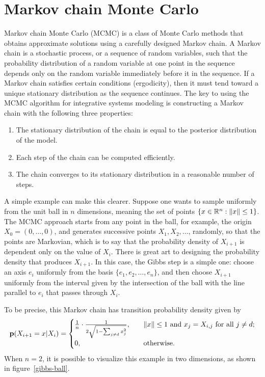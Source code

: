 \section{Markov chain Monte Carlo}
Markov chain Monte Carlo (MCMC) is a class of Monte Carlo methods that
obtains approximate solutions using a carefully designed Markov
chain. A Markov chain is a stochastic process, or a sequence of random
variables, such that the probability distribution of a random variable
at one point in the sequence depends only on the random variable
immediately before it in the sequence. If a Markov chain satisfies
certain conditions (ergodicity), then it must tend toward a unique stationary
distribution as the sequence continues. The key to using the MCMC
algorithm for integrative systems modeling is constructing a Markov
chain with the following three properties:
\begin{enumerate}
\item The stationary distribution of the chain is equal to the
  posterior distribution of the model.
\item Each step of the chain can be computed efficiently.
\item The chain converges to its stationary distribution in a
  reasonable number of steps.
\end{enumerate}

A simple example can make this clearer. Suppose one wants to sample
uniformly from the unit ball in $n$ dimensions, meaning the set of
points $\{x \in \mathbb{R}^n: \|x\| \leq 1\}$.  The MCMC approach starts
from any point in the ball, for example, the origin $X_0 = (0, \ldots,
0)$, and generates successive points $X_1, X_2, \ldots$, randomly, so
that the points are Markovian, which is to say that the probability density
of $X_{i+1}$ is dependent only on the value of $X_i$.  There is great
art to designing the probability density that produces $X_{i+1}$.  In
this case, the Gibbs step is a simple one: choose an axis $e_i$
uniformly from the basis $\{e_1, e_2, \ldots, e_n\}$, and then choose
$X_{i+1}$ uniformly from the interval given by the
intersection of the ball with the line parallel to $e_i$ that passes through $X_i$.

To be precise, this Markov chain has transition probability density given by
\[
\mathbf{p}(X_{i+1}=x|X_i) =
\begin{cases}
\frac{1}{n}\cdot\frac{1}{2\sqrt{1-\sum_{j \neq d} x_j^2}}, &\quad\|x\| \leq 1 \text{ and } x_j = X_{i,j} \text{ for all }j \neq d;\\
0, &\quad\text{otherwise.}
\end{cases}
\]
When $n=2$, it is possible to visualize this example in two dimensions, as shown in figure~\ref{gibbs-ball}.

